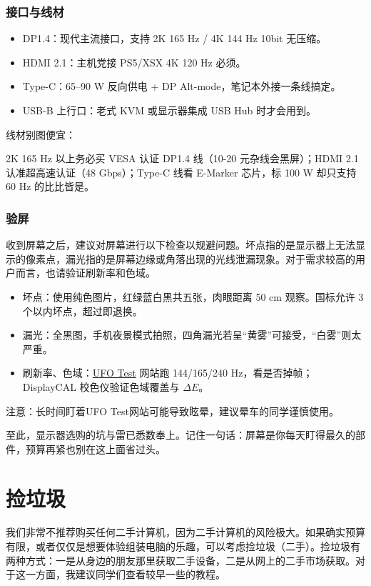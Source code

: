 \documentclass[../main.tex]{subfiles}
\begin{document}
\subsubsection{接口与线材}

\begin{itemize}
  \item DP1.4：现代主流接口，支持 2K 165 Hz / 4K 144 Hz 10bit 无压缩。
  \item HDMI 2.1：主机党接 PS5/XSX 4K 120 Hz 必须。
  \item Type-C：65–90 W 反向供电 + DP Alt-mode，笔记本外接一条线搞定。
  \item USB-B 上行口：老式 KVM 或显示器集成 USB Hub 时才会用到。
\end{itemize}

线材别图便宜：

2K 165 Hz 以上务必买 VESA 认证 DP1.4 线（10-20 元杂线会黑屏）；HDMI 2.1 认准超高速认证（48 Gbps）；Type-C 线看 E-Marker 芯片，标 100 W 却只支持 60 Hz 的比比皆是。

\subsubsection{验屏}

收到屏幕之后，建议对屏幕进行以下检查以规避问题。坏点指的是显示器上无法显示的像素点，漏光指的是屏幕边缘或角落出现的光线泄漏现象。对于需求较高的用户而言，也请验证刷新率和色域。

\begin{itemize}
  \item 坏点：使用纯色图片，红绿蓝白黑共五张，肉眼距离 50 cm 观察。国标允许 3 个以内坏点，超过即退换。
  \item 漏光：全黑图，手机夜景模式拍照，四角漏光若呈“黄雾”可接受，“白雾”则太严重。
  \item 刷新率、色域：\href{https://www.testufo.com/}{UFO Test} 网站跑 144/165/240 Hz，看是否掉帧；DisplayCAL 校色仪验证色域覆盖与 $\Delta E$。
\end{itemize}

注意：长时间盯着UFO Test网站可能导致眩晕，建议晕车的同学谨慎使用。

至此，显示器选购的坑与雷已悉数奉上。记住一句话：屏幕是你每天盯得最久的部件，预算再紧也别在这上面省过头。

\section{捡垃圾}

我们非常不推荐购买任何二手计算机，因为二手计算机的风险极大。如果确实预算有限，或者仅仅是想要体验组装电脑的乐趣，可以考虑捡垃圾（二手）。捡垃圾有两种方式：一是从身边的朋友那里获取二手设备，二是从网上的二手市场获取。对于这一方面，我建议同学们查看较早一些的教程。
\end{document}
